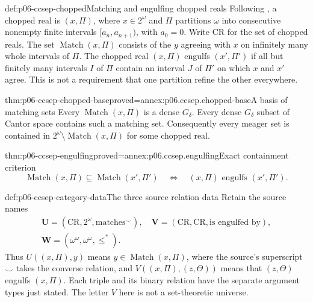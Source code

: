 \begin{hbdefinition}{def:p06-ccsep-chopped}{Matching and engulfing chopped reals}
Following \cite[\S3]{BlassReductions1994V1}, a chopped real is
\((x,\Pi)\), where \(x\in2^\omega\) and \(\Pi\) partitions
\(\omega\) into consecutive nonempty finite intervals
\([a_n,a_{n+1})\), with \(a_0=0\). Write \(\mathrm{CR}\) for
the set of chopped reals. The set \(\operatorname{Match}(x,\Pi)\)
consists of the \(y\) agreeing with \(x\) on infinitely many
whole intervals of \(\Pi\).
The chopped real \((x,\Pi)\) engulfs \((x',\Pi')\) if all but
finitely many intervals \(I\) of \(\Pi\) contain an interval
\(J\) of \(\Pi'\) on which \(x\) and \(x'\) agree.
This is not a requirement that one partition refine the other everywhere.
\end{hbdefinition}

\begin{hblemma}{thm:p06-ccsep-chopped-base}{proved=annex:p06.ccsep.chopped-base}{A basis of matching sets}
Every \(\operatorname{Match}(x,\Pi)\) is a dense \(G_\delta\).
Every dense \(G_\delta\) subset of Cantor space contains such a
matching set. Consequently every meager set is contained in
\(2^\omega\setminus\operatorname{Match}(x,\Pi)\) for some chopped real.
\end{hblemma}

\begin{hblemma}{thm:p06-ccsep-engulfing}{proved=annex:p06.ccsep.engulfing}{Exact containment criterion}
\[
 \operatorname{Match}(x,\Pi)\subseteq
 \operatorname{Match}(x',\Pi')
 \quad\Longleftrightarrow\quad
 (x,\Pi)\text{ engulfs }(x',\Pi').
\]
\end{hblemma}

\begin{hbdefinition}{def:p06-ccsep-category-data}{The three source relation data}
Retain the source names
\[
\begin{gathered}
 \mathbf U=(\mathrm{CR},2^\omega,\text{matches}^{\smile}),\quad
 \mathbf V=(\mathrm{CR},\mathrm{CR},\text{is engulfed by}),\\
 \mathbf W=(\omega^\omega,\omega^\omega,\leq^*).
\end{gathered}
\]
Thus \(U((x,\Pi),y)\) means \(y\in\operatorname{Match}(x,\Pi)\),
where the source's superscript \(\smile\) takes the converse relation,
and \(V((x,\Pi),(z,\Theta))\) means that \((z,\Theta)\)
engulfs \((x,\Pi)\). Each triple and its binary relation have
the separate argument types just stated. The letter \(V\) here
is not a set-theoretic universe.
\end{hbdefinition}

